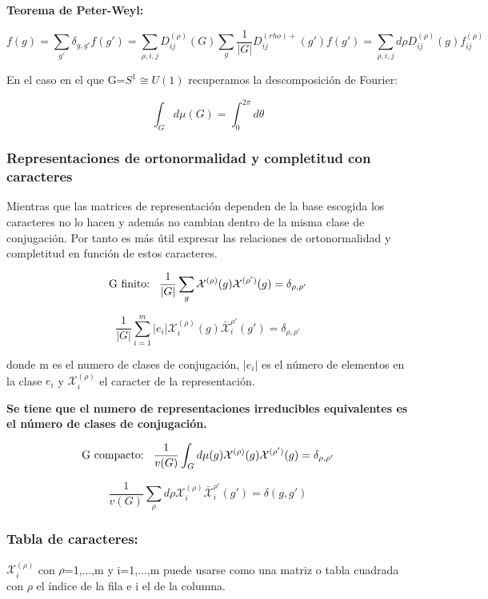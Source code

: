 \smallskip
\textbf{Teorema de Peter-Weyl:}

$$f(g)=\sum _{g'}\delta _{g,g'}f(g')=\sum _{\rho,i,j}D_{ij}^{(\rho)}(G)\sum _g \frac{1}{|G|}D_{ij}^{(rho)+}(g')f(g')=\sum _{\rho ,i, j} d\rho D_{ij}^{(\rho)}(g)f_{ij}^{(\rho)}$$

\smallskip
En el caso en el que G=$S^1\cong U(1)$ recuperamos la descomposición de Fourier:

$$\int _G d \mu (G)=\int ^{2\pi}_0 d\theta$$

\subsubsection{Representaciones de ortonormalidad y completitud con caracteres}

Mientras que las matrices de representación dependen de la base escogida los caracteres no lo hacen y además no cambian dentro de la misma clase de conjugación. Por tanto es más útil expresar las relaciones de ortonormalidad y completitud en función de estos caracteres.

$$\text{G finito:} \hspace{0.3cm} \frac{1}{|G|}\sum _g\mathcal{X}^{(\rho)}(g)\mathcal{X}^{(\rho ')}(g)=\delta _{\rho , \rho '}$$

$$\frac{1}{|G|}\sum _{i=1}^m |e_i|\mathcal{X}_i^{(\rho)}(g)\bar{\mathcal{X}}_i^{\rho '}(g')=\delta _{\rho , \rho '}$$

donde m es el numero de clases de conjugación, $|e_i|$ es el número de elementos en la clase $e_i$ y $\mathcal{X}_i^{(\rho)}$ el caracter de la representación.

\textbf{Se tiene que el numero de representaciones irreducibles equivalentes es el número de clases de conjugación.}

$$\text{G compacto:} \hspace{0.3cm} \frac{1}{v(G)}\int _G d\mu (g) \mathcal{X}^{(\rho)} (g)\mathcal{X}^{(\rho  ')}(g)=\delta _{\rho , \rho '}$$

$$\frac{1}{v(G)}\sum _\rho d \rho \mathcal{X}_i^{(\rho)} \bar{\mathcal{X}}_i^{\rho'} (g') =\delta (g,g') $$


\subsubsection{Tabla de caracteres:}

\smallskip
$\mathcal{X}_i^{(\rho)}$ con $\rho $=1,...,m y i=1,...,m puede usarse como una matriz o tabla cuadrada con $\rho$ el índice de la fila e i el de la columna.


